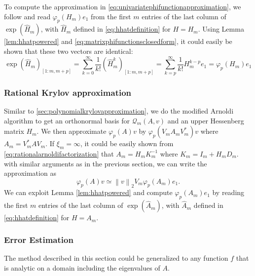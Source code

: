 To compute the approximation in \eqref{eq:univariatephifunctionapproximation}, we follow \cite{niesen2012} and read $\varphi_p(H_m) e_1$
from the first $m$ entries of the last column of $\exp(\hat{H}_m)$, with $\hat{H}_m$ defined in \eqref{eq:hhatdefinition} for $H = H_m$.
Using Lemma \ref{lem:hhatpowered} and \eqref{eq:matrixphifunctionsclosedform}, it could easily be shown that these two vectors are identical:
\begin{equation*}
    \exp(\hat{H}_m)_{[1 : m, m+p]}
    = \sum_{k=0}^{\infty}{\frac{1}{k!} (\hat{H}_m^k)_{[1 : m, m+p]}}
    = \sum_{k=p}^{\infty}{\frac{1}{k!} H_m^{k-p}e_1} = \varphi_p(H_m) e_1
\end{equation*}


\subsubsection{Rational Krylov approximation}
\label{sec:rationalkrylovapproximation}
Similar to \autoref{sec:polynomialkrylovapproximation}, we do the modified Arnoldi algorithm to get an orthonormal
basis for $\mathcal{Q}_m(A, v)$ and an upper Hessenberg matrix $H_m$. We then approximate $\varphi_p(A)v$ by
$\varphi_p(V_m A_m V_m^*)v$ where $A_m = V_m^* A V_m$. If $\xi_m = \infty$, it could be easily shown from
\eqref{eq:rationalarnoldifactorization} that $A_m = H_m K_m^{-1}$ where $K_m = I_m + H_m D_m$. with similar arguments
as in the previous section, we can write the approximation as
\begin{equation}
    \label{eq:univariatephifunctionrationalapproximation}
    \varphi_p(A)v \simeq \left\| v \right\|_{2} V_m \varphi_p(A_m) e_1.
\end{equation}
We can exploit Lemma \ref{lem:hhatpowered} and compute $\varphi_p(A_m) e_1$ by reading the first $m$ entries of the
last column of $\exp(\hat{A}_m)$, with $\hat{A}_m$ defined in \eqref{eq:hhatdefinition} for $H = A_m$.

\subsubsection{Error Estimation}
The method described in this section could be generalized to any function $f$ that is
analytic on a domain including the eigenvalues of $A$.

